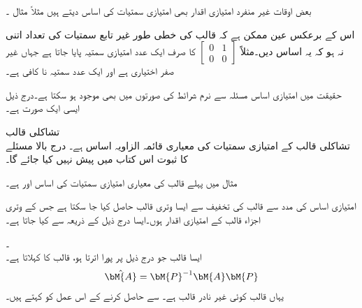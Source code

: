 بعض اوقات غیر منفرد امتیازی اقدار بھی امتیازی سمتیات کی اساس دیتے ہیں مثلاً مثال ۔

اس کے برعکس عین ممکن ہے کہ قالب کی خطی طور غیر تابع سمتیات کی تعداد اتنی نہ ہو کہ یہ اساس دیں۔مثلاً 
$[\begin{smallmatrix} 0&1\\0&0  \end{smallmatrix}]$
کا صرف ایک عدد امتیازی سمتیہ  پایا جاتا ہے جہاں  غیر صفر اختیاری ہے اور ایک عدد سمتیہ نا کافی ہے۔ 

حقیقت میں امتیازی اساس مسئلہ  سے نرم شرائط کی صورتوں میں بھی موجود ہو سکتا ہے۔درج ذیل ایسی ایک صورت ہے۔

\quad تشاکلی قالب\\
تشاکلی قالب کے امتیازی سمتیات  کی  معیاری قائمہ الزاویہ اساس  ہے۔  
درج بالا مسئلے کا ثبوت اس کتاب میں پیش نہیں کیا جائے گا۔

مثال  میں پہلے قالب کی معیاری امتیازی سمتیات کی اساس  اور
  ہے۔  

 امتیازی اساس کی مدد سے  قالب  کی تخفیف سے ایسا  وتری قالب حاصل کیا جا سکتا ہے جس کے وتری اجزاء قالب  کے امتیازی اقدار ہوں۔ایسا درج ذیل  کے ذریعہ سے کیا جاتا ہے۔

\quad {}۔ \\
ایسا  قالب  جو درج ذیل پر پورا اترتا ہو،  قالب  کا  کہلاتا ہے۔
\begin{align}
\hat{\bM{A}}=\bM{P}^{-1}\bM{A}\bM{P}
\end{align}
یہاں  قالب  کوئی غیر نادر قالب ہے۔ سے  حاصل کرنے کے اس عمل کو  کہتے ہیں۔

